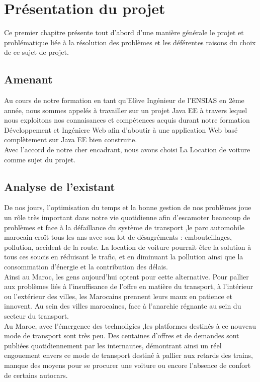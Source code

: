 \chapter{Présentation du projet}
\vspace{5cm}
\large{Ce premier chapitre présente tout d’abord d’une manière générale le projet et problématique liée à la résolution des problèmes et les déférentes raisons du choix de ce sujet de projet.\\}


\newpage
\section{Amenant}
\large{Au cours de notre formation en tant qu'Elève Ingénieur de l'ENSIAS en 2ème année, nous sommes appelés à travailler sur un projet Java EE à travers lequel nous exploitons nos connaisances et compétences acquis durant notre formation Développement et Ingéniere Web afin d'aboutir à une application Web basé complètement sur Java EE bien construite.\\
Avec l'accord de notre cher encadrant, nous avons choisi La Location de voiture comme sujet du projet.\\}
\section{Analyse de l'existant}
\large{De nos jours, l’optimisation du temps et la bonne gestion de nos problèmes joue un rôle très important dans notre vie quotidienne afin d’escamoter beaucoup de problèmes et face à la défaillance du système de transport ,le parc automobile marocain croît tous les ans avec son lot de désagréments : embouteillages, pollution, accident de la route. La location de voiture pourrait être la solution à tous ces soucis en réduisant le trafic, et en diminuant la pollution ainsi que la consommation d'énergie et la contribution des délais.\\

Ainsi au Maroc, les gens aujourd'hui optent pour cette alternative. Pour pallier aux problèmes liés à l'insuffisance de l'offre en matière du transport, à l'intérieur ou l'extérieur des villes, les Marocains prennent leurs maux en patience et innovent. Au sein des villes marocaines, face à l'anarchie régnante au sein du secteur du transport.\\

Au Maroc, avec l'émergence des technoligies ,les platformes  destinés à ce nouveau mode de transport sont très peu. Des centaines d'offres et de demandes sont publiées quotidiennement par les internautes, démontrant ainsi un réel engouement envers ce mode de transport destiné à pallier aux retards des trains, manque des moyens pour se procurer une voiture ou encore l'absence de confort de certains autocars.\\}
